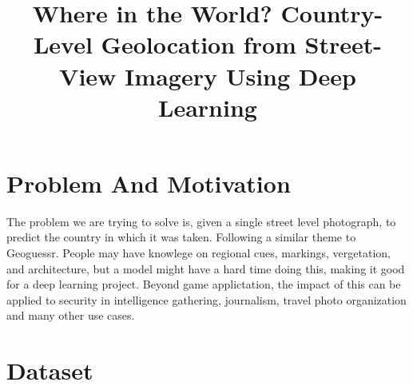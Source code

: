 \documentclass[conference]{IEEEtran}
\begin{document}
\title{Where in the World? Country-Level Geolocation from Street-View Imagery Using Deep Learning}

\author{
\and
{}
\and
{}
}

\maketitle

%

\section{{Problem And Motivation}}

The problem we are trying to solve is, given a single street level photograph, to predict the country in which it was taken. Following a similar theme to Geoguessr. People may have knowlege on regional cues, markings, vergetation, and architecture, but a model might have a hard time doing this, making it good for a deep learning project. Beyond game applictation, the impact of this can be applied to security in intelligence gathering, journalism, travel photo organization and many other use cases.

\section{Dataset}
\end{document}
